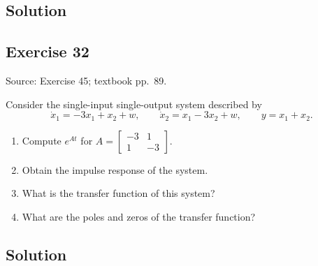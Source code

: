\documentclass[12pt,a4paper]{article}
\newlength{\questionroom}
\newenvironment{questionprompt}{%
  \begin{lrbox}{\questionbox}\begin{minipage}{\linewidth}%
}{%
  \end{minipage}\end{lrbox}%
  \setlength{\questionroom}{\dimexpr\ht\questionbox+\dp\questionbox+5.2cm\relax}%
  \ifdim\questionroom>\textheight\setlength{\questionroom}{\textheight}\fi
  \Needspace{\questionroom}%
  \noindent\usebox{\questionbox}\par
}
\begin{document}
\subsection*{Solution}
\vspace{3.5cm}


\begin{questionprompt}
\section*{Exercise 32}
\label{practice:32}
{\small Source: Exercise 45; textbook pp.~89.}\par
Consider the single-input single-output system described by
\[\dot x_1=-3x_1+x_2+w,\qquad\dot x_2=x_1-3x_2+w,\qquad y=x_1+x_2.\]
\begin{enumerate}[label=(\alph*)]
\item Compute $e^{At}$ for $A=\begin{bmatrix}-3&1\\1&-3\end{bmatrix}$.
\item Obtain the impulse response of the system.
\item What is the transfer function of this system?
\item What are the poles and zeros of the transfer function?
\end{enumerate}
\end{questionprompt}
\subsection*{Solution}
\vspace{3.5cm}
\end{document}
